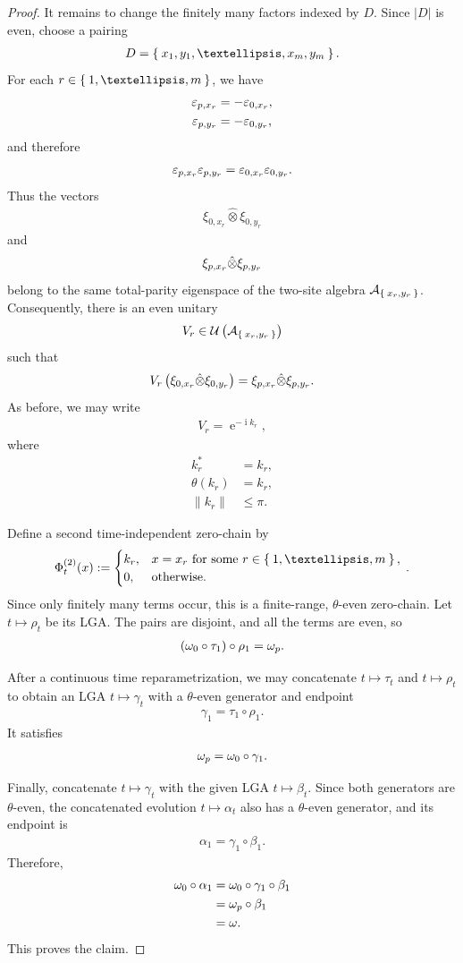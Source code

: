 \documentclass[10pt,a4paper]{amsart}
\newcommand{\br}[1]{\left(#1\right)}
\newcommand{\calA}{\mathcal{A}}
\newcommand{\calU}{\mathcal{U}}
\newcommand{\ee}{\operatorname{e}}
\newcommand{\eq}[1]{\begin{align*}#1\end{align*}}
\newcommand{\eql}[1]{\begin{align}#1\end{align}}
\newcommand{\ii}{\operatorname{i}}
\newcommand\norm[1]{\left\lVert#1\right\rVert}
\newcommand{\ve}{\varepsilon}
\begin{document}
\begin{proof}
It remains to change the finitely many factors indexed by $D$. Since
$\lvert D\rvert$ is even, choose a pairing
\eq{
D
=
\Set{
x_1,y_1,\ldots,x_m,y_m
}.
}
For each $r\in\Set{1,\ldots,m}$, we have
\eq{
\ve_{{\rm p},x_r}
&=
-\ve_{0,x_r},\\
\ve_{{\rm p},y_r}
&=
-\ve_{0,y_r},
}
and therefore
\eq{
\ve_{{\rm p},x_r}\ve_{{\rm p},y_r}
=
\ve_{0,x_r}\ve_{0,y_r}.
}
Thus the vectors
\eq{
\xi_{0,x_r}
\hat{\otimes}
\xi_{0,y_r}
}
and
\eq{
\xi_{{\rm p},x_r}
\hat{\otimes}
\xi_{{\rm p},y_r}
}
belong to the same total-parity eigenspace of the two-site algebra
$\calA_{\Set{x_r,y_r}}$. Consequently, there is an even unitary
\eq{
V_r
\in
\calU\br{
\calA_{\Set{x_r,y_r}}
}
}
such that
\eq{
V_r
\br{
\xi_{0,x_r}
\hat{\otimes}
\xi_{0,y_r}
}
=
\xi_{{\rm p},x_r}
\hat{\otimes}
\xi_{{\rm p},y_r}.
}
As before, we may write
\eq{
V_r
=
\ee^{-\ii k_r},
}
where
\eq{
k_r^\ast
&=
k_r,\\
\theta(k_r)
&=
k_r,\\
\norm{k_r}
&\leq
\pi.
}

Define a second time-independent zero-chain by
\eq{
\Phi^{(2)}_t(x)
:=
\begin{cases}
k_r,
&
x=x_r
\text{ for some }
r\in\Set{1,\ldots,m},\\
0,
&
\text{otherwise}.
\end{cases}\,.
}
Since only finitely many terms occur, this is a finite-range,
$\theta$-even zero-chain. Let $t\mapsto\rho_t$ be its LGA. The pairs are
disjoint, and all the terms are even, so
\eq{
\br{
\omega_0\circ\tau_1
}
\circ\rho_1
=
\omega_{\rm p}.
}

After a continuous time reparametrization, we may concatenate
$t\mapsto\tau_t$ and $t\mapsto\rho_t$ to obtain an LGA
$t\mapsto\gamma_t$ with a $\theta$-even generator and endpoint
\eq{
\gamma_1
=
\tau_1\circ\rho_1.
}
It satisfies
\eql{
\omega_{\rm p}
=
\omega_0\circ\gamma_1.
}

Finally, concatenate $t\mapsto\gamma_t$ with the given LGA
$t\mapsto\beta_t$. Since both generators are $\theta$-even, the
concatenated evolution $t\mapsto\alpha_t$ also has a $\theta$-even
generator, and its endpoint is
\eq{
\alpha_1
=
\gamma_1\circ\beta_1.
}
Therefore,
\eq{
\omega_0\circ\alpha_1
&=
\omega_0\circ\gamma_1\circ\beta_1\\
&=
\omega_{\rm p}\circ\beta_1\\
&=
\omega.
}
This proves the claim.
\end{proof}
\end{document}
